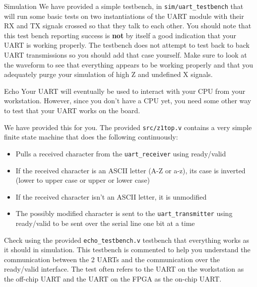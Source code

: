 \documentclass[11pt]{article}
\makeatletter
\renewcommand{\section}
{\@startsection {section}{1}{0pt}
 {-2ex}
 {1ex}
 {\bfseries\Large}}
\renewcommand{\subsection}
{\@startsection {subsection}{1}{0pt}
 {-1ex}
 {0.5ex}
 {\bfseries\normalsize}}
\makeatother
\begin{document}
\subsection{Simulation}
We have provided a simple testbench, in \verb|sim/uart_testbench| that will run some basic tests on two instantiations of the UART module with their RX and TX signals crossed so that they talk to each other.
You should note that this test bench reporting success is \textbf{not} by itself a good indication that your UART is working properly.
The testbench does not attempt to test back to back UART transmissions so you should add that case yourself.
Make sure to look at the waveform to see that everything appears to be working properly and that you adequately purge your simulation of high Z and undefined X signals.


\section{Echo}
Your UART will eventually be used to interact with your CPU from your workstation.
However, since you don't have a CPU yet, you need some other way to test that your UART works on the board.

We have provided this for you. The provided \verb|src/z1top.v| contains a very simple finite state machine that does the following continuously:

\begin{itemize}
  \item Pulls a received character from the \verb|uart_receiver| using ready/valid
  \item If the received character is an ASCII letter (A-Z or a-z), its case is inverted (lower to upper case or upper or lower case)
  \item If the received character isn't an ASCII letter, it is unmodified
  \item The possibly modified character is sent to the \verb|uart_transmitter| using ready/valid to be sent over the serial line one bit at a time
\end{itemize}

Check using the provided \verb|echo_testbench.v| testbench that everything works as it should in simulation.
This testbench is commented to help you understand the communication between the 2 UARTs and the communication over the ready/valid interface.
The test often refers to the UART on the workstation as the off-chip UART and the UART on the FPGA as the on-chip UART.
\end{document}
